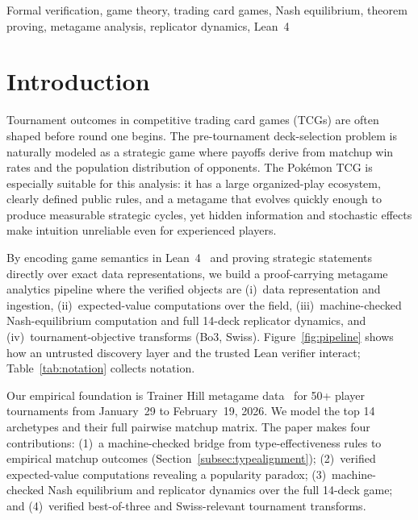 \documentclass[journal]{IEEEtran}
\newif\ifhighlightchanges
\newcommand{\revised}[1]{\ifhighlightchanges\textcolor{blue!70!black}{#1}\else#1\fi}
\let\origsection\section
\renewcommand{\section}{\needspace{4\baselineskip}\origsection}
\begin{document}
\begin{IEEEkeywords}
Formal verification, game theory, trading card games, Nash equilibrium, theorem proving, metagame analysis, replicator dynamics, Lean~4
\end{IEEEkeywords}

\section{Introduction}

Tournament outcomes in competitive trading card games (TCGs) are often shaped before round one begins.
The pre-tournament deck-selection problem is naturally modeled as a strategic game where payoffs derive from matchup win rates and the population distribution of opponents.
The Pok\'emon TCG is especially suitable for this analysis: it has a large organized-play ecosystem, clearly defined public rules, and a metagame that evolves quickly enough to produce measurable strategic cycles, yet hidden information and stochastic effects make intuition unreliable even for experienced players.

By encoding game semantics in Lean~4~\cite{moura2021lean} and proving strategic statements directly over exact data representations, we build a proof-carrying metagame analytics pipeline where the verified objects are
(i)~data representation and ingestion,
(ii)~expected-value computations over the field,
(iii)~machine-checked Nash-equilibrium computation and full 14-deck replicator dynamics, and
(iv)~tournament-objective transforms (Bo3, Swiss).
\revised{Figure~\ref{fig:pipeline} shows how an untrusted discovery layer and the trusted Lean verifier interact; Table~\ref{tab:notation} collects notation.}

Our empirical foundation is Trainer Hill metagame data~\cite{trainerhill2026,limitless2024} for 50+ player tournaments from January~29 to February~19, 2026.
We model the top 14 archetypes and their full pairwise matchup matrix.
The paper makes four contributions:
(1)~a machine-checked bridge from type-effectiveness rules to empirical matchup outcomes (Section~\ref{subsec:typealignment});
(2)~verified expected-value computations revealing a popularity paradox;
(3)~machine-checked Nash equilibrium and replicator dynamics over the full 14-deck game; and
(4)~verified best-of-three and Swiss-relevant tournament transforms.
\end{document}
